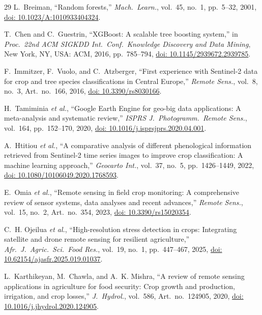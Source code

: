 \documentclass[conference]{IEEEtran}
\begin{document}
\begin{thebibliography}{29}
L.~Breiman,
``Random forests,''
\textit{Mach.\ Learn.}, vol.~45, no.~1, pp.~5--32, 2001,
\href{https://doi.org/10.1023/A:1010933404324}{doi: 10.1023/A:1010933404324}.

T.~Chen and C.~Guestrin,
``XGBoost: A scalable tree boosting system,''
in \textit{Proc.\ 22nd ACM SIGKDD Int.\ Conf.\ Knowledge Discovery and
Data Mining}, New York, NY, USA: ACM, 2016, pp.~785--794,
\href{https://doi.org/10.1145/2939672.2939785}{doi: 10.1145/2939672.2939785}.

F.~Immitzer, F.~Vuolo, and C.~Atzberger,
``First experience with Sentinel-2 data for crop and tree species
classifications in Central Europe,''
\textit{Remote Sens.}, vol.~8, no.~3, Art.\ no.~166, 2016,
\href{https://doi.org/10.3390/rs8030166}{doi: 10.3390/rs8030166}.

H.~Tamiminia \textit{et al.},
``Google Earth Engine for geo-big data applications: A meta-analysis and
systematic review,''
\textit{ISPRS J.\ Photogramm.\ Remote Sens.}, vol.~164, pp.~152--170, 2020,
\href{https://doi.org/10.1016/j.isprsjprs.2020.04.001}{doi: 10.1016/j.isprsjprs.2020.04.001}.

A.~Htitiou \textit{et al.},
``A comparative analysis of different phenological information retrieved from
Sentinel-2 time series images to improve crop classification: A machine
learning approach,''
\textit{Geocarto Int.}, vol.~37, no.~5, pp.~1426--1449, 2022,
\href{https://doi.org/10.1080/10106049.2020.1768593}{doi: 10.1080/10106049.2020.1768593}.

E.~Omia \textit{et al.},
``Remote sensing in field crop monitoring: A comprehensive review of sensor
systems, data analyses and recent advances,''
\textit{Remote Sens.}, vol.~15, no.~2, Art.\ no.~354, 2023,
\href{https://doi.org/10.3390/rs15020354}{doi: 10.3390/rs15020354}.

C.~H. Ojeilua \textit{et al.},
``High-resolution stress detection in crops: Integrating satellite and drone
remote sensing for resilient agriculture,''
\textit{Afr.\ J.\ Agric.\ Sci.\ Food Res.}, vol.~19, no.~1,
pp.~447--467, 2025,
\href{https://doi.org/10.62154/ajasfr.2025.019.01037}{doi: 10.62154/ajasfr.2025.019.01037}.

L.~Karthikeyan, M.~Chawla, and A.~K. Mishra,
``A review of remote sensing applications in agriculture for food security:
Crop growth and production, irrigation, and crop losses,''
\textit{J.\ Hydrol.}, vol.~586, Art.\ no.~124905, 2020,
\href{https://doi.org/10.1016/j.jhydrol.2020.124905}{doi: 10.1016/j.jhydrol.2020.124905}.


\end{thebibliography}
\end{document}
